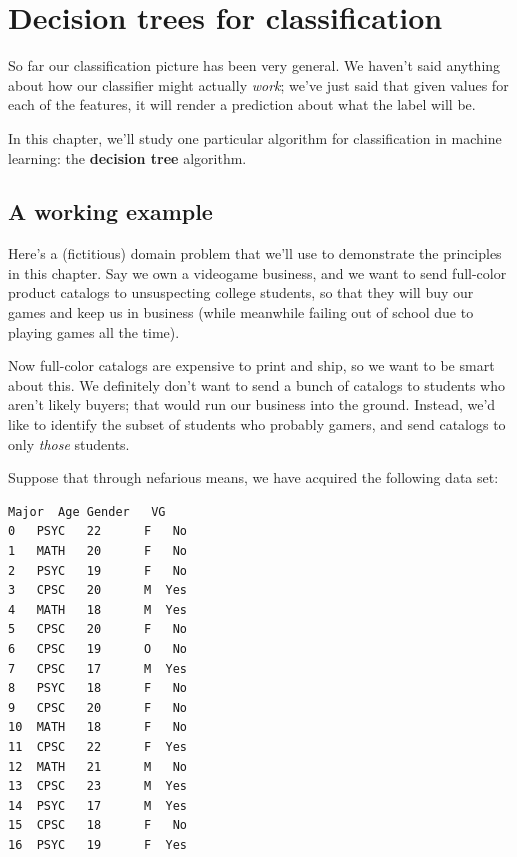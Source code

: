 
\chapter{Decision trees for classification}

So far our classification picture has been very general. We haven't said
anything about how our classifier might actually \textit{work}; we've just said
that given values for each of the features, it will render a prediction about
what the label will be.


In this chapter, we'll study one particular algorithm for classification in
machine learning: the \textbf{decision tree} algorithm.

\section{A working example}

 
Here's a (fictitious) domain problem that we'll use to demonstrate the
principles in this chapter. Say we own a videogame business, and we want to
send full-color product catalogs to unsuspecting college students, so that they
will buy our games and keep us in business (while meanwhile failing out of
school due to playing games all the time).

Now full-color catalogs are expensive to print and ship, so we want to be smart
about this. We definitely don't want to send a bunch of catalogs to students
who aren't likely buyers; that would run our business into the ground. Instead,
we'd like to identify the subset of students who probably gamers, and send
catalogs to only \textit{those} students.

Suppose that through nefarious means, we have acquired the following data set:

\begin{Verbatim}[fontsize=\small,samepage=true,frame=single,framesep=3mm,xleftmargin=4.3cm,xrightmargin=4.2cm]
   Major  Age Gender   VG
0   PSYC   22      F   No
1   MATH   20      F   No
2   PSYC   19      F   No
3   CPSC   20      M  Yes
4   MATH   18      M  Yes
5   CPSC   20      F   No
6   CPSC   19      O   No
7   CPSC   17      M  Yes
8   PSYC   18      F   No
9   CPSC   20      F   No
10  MATH   18      F   No
11  CPSC   22      F  Yes
12  MATH   21      M   No
13  CPSC   23      M  Yes
14  PSYC   17      M  Yes
15  CPSC   18      F   No
16  PSYC   19      F  Yes
\end{Verbatim}

